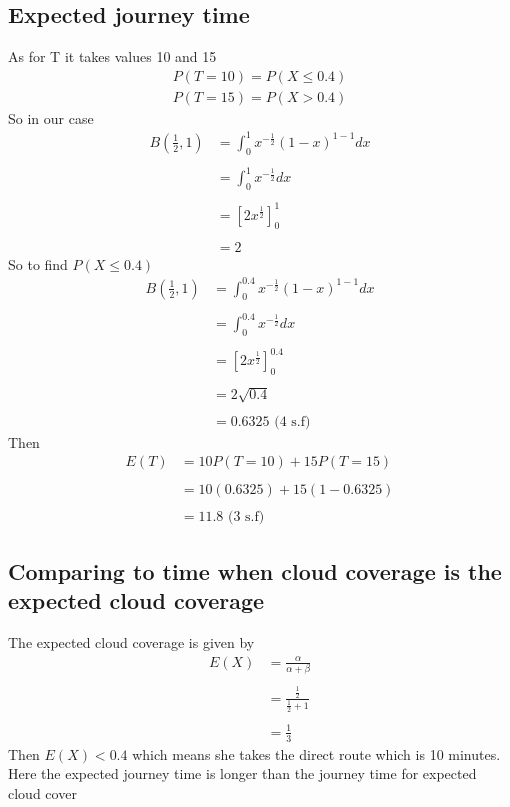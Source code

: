 \documentclass[11pt]{article}
\begin{document}
\subsection{Expected journey time}
As for T it takes values 10 and 15
\begin{align*}
    P(T = 10) = P(X\leq 0.4) \\
    P(T = 15) = P(X > 0.4)
\end{align*}
So in our case
\begin{align*}
    B\left(\frac{1}{2},1 \right) &= \int_{0}^{1} x^{-\frac{1}{2}}(1-x)^{1-1} dx \\ \\
                                 &= \int_{0}^{1} x^{-\frac{1}{2}} dx \\ \\
                                 &= \left[2x^{\frac{1}{2}}\right]_{0}^{1}  \\ \\
                                 &= 2
\end{align*}
So to find $P(X\leq 0.4)$
\begin{align*}
    B\left(\frac{1}{2},1 \right) &= \int_{0}^{0.4} x^{-\frac{1}{2}}(1-x)^{1-1} dx \\ \\
                                 &= \int_{0}^{0.4} x^{-\frac{1}{2}} dx \\ \\
                                 &= \left[2x^{\frac{1}{2}}\right]_{0}^{0.4}  \\ \\
                                 &= 2 \sqrt{0.4} \\ \\
                                 &= 0.6325 \text{ (4 s.f) }
\end{align*}
Then
\begin{align*}
    E(T) &= 10P(T=10) + 15P(T=15) \\ \\
         &= 10(0.6325) + 15(1-0.6325) \\ \\
         &= \boxed{\bm{11.8}} \text{ (3 s.f) }
\end{align*}
\subsection{Comparing to time when cloud coverage is the expected cloud coverage}
The expected cloud coverage is given by
\begin{align*}
    E(X) &= \frac{\alpha}{\alpha+\beta} \\ \\
         &= \frac{\frac{1}{2}}{\frac{1}{2} + 1} \\ \\
         &= \frac{1}{3}
\end{align*}
Then $E(X) < 0.4$ which means she takes the direct route which is 10 minutes. Here the expected journey time is longer than the journey time for expected cloud cover
\end{document}

